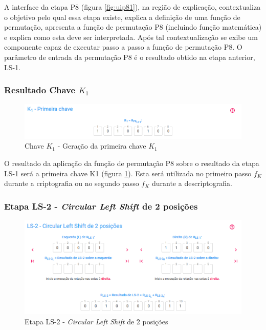 A interface da etapa P8 (figura \ref{fig:uip81}), na região de explicação, contextualiza o objetivo pelo qual essa etapa existe, explica a definição de uma função de permutação, apresenta a função de permutação P8 (incluindo função matemática) e explica como esta deve ser interpretada. Após tal contextualização se exibe um componente capaz de executar passo a passo a função de permutação P8. O parâmetro de entrada da permutação P8 é o resultado obtido na etapa anterior, LS-1.

\subsubsection{Resultado Chave \(K_1\)}

\begin{figure}[H]
    \centering
    \caption{Chave \(K_1\) - Geração da primeira chave \(K_1\)}
    \label{fig:uik1}
    \includegraphics[width=1\linewidth]{UI/UIK1.png}
\end{figure}

O resultado da aplicação da função de permutação P8 sobre o resultado da etapa LS-1 será a primeira chave K1 (figura \ref{fig:uik1}). Esta será utilizada no primeiro passo \(f_K\) durante a criptografia ou no segundo passo \(f_K\) durante a descriptografia.

\subsubsection{Etapa LS-2 - \textit{Circular Left Shift} de 2 posições}

\begin{figure}[H]
    \centering
    \caption{Etapa LS-2 - \textit{Circular Left Shift} de 2 posições}
    \label{fig:uils2}
    \includegraphics[width=1\linewidth]{UI/UILS2.png}
\end{figure}

